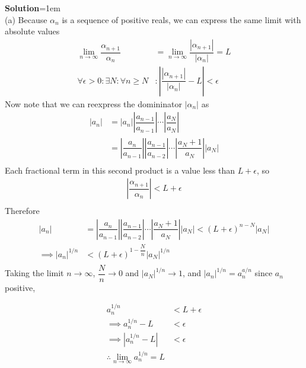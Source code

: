 \documentclass{article}
\begin{document}
\textbf{Solution}\parskip=1em\\
(a) Because $\alpha_n$ is a sequence of positive reals, we can express the same limit with absolute values
\begin{align*}
    \lim\limits_{n\to \infty} \dfrac{\alpha_{n+1}}{\alpha_n} &= \lim\limits_{n\to \infty} \dfrac{|\alpha_{n+1}|}{|\alpha_n|} = L\\
    \forall \epsilon > 0: \exists N : \forall n \geq N &: \left|\dfrac{|\alpha_{n+1}|}{|\alpha_n|} - L \right| < \epsilon
\end{align*}
Now note that we can reexpress the domininator $|\alpha_n|$ as 
\begin{align*}
    |a_n| &= |a_n|\left|\dfrac{a_{n-1}}{a_{n-1}}\right| \cdots \left|\dfrac{a_N}{a_N}\right|\\
    &= \left|\dfrac{a_{n}}{a_{n-1}}\right|\left|\dfrac{a_{n-1}}{a_{n-2}}\right| \cdots \left|\dfrac{a_N+1}{a_N}\right|\left|a_N\right|\\
\end{align*}
Each fractional term in this second product is a value less than $L+\epsilon$, so 
\begin{align*}
    \left|\dfrac{\alpha_{n+1}}{\alpha_n}\right| < L + \epsilon\\
\end{align*}
Therefore
\begin{align*}
    |a_n| &= \left|\dfrac{a_{n}}{a_{n-1}}\right|\left|\dfrac{a_{n-1}}{a_{n-2}}\right| \cdots \left|\dfrac{a_N+1}{a_N}\right|\left|a_N\right|< (L+\epsilon)^{n-N}\left|a_N\right|\\
    \implies |a_n|^{1/n} &< (L + \epsilon)^{1 - \dfrac{N}{n}}|a_N|^{1/n}\\
\end{align*}
Taking the limit $n\to \infty$, $\dfrac{N}{n} \to 0$ and $|a_N|^{1/n} \to 1$, and $|a_n|^{1/n} = a_n^{a/n}$ since $a_n$ positive,

\begin{align*}
    a_n^{1/n} &< L + \epsilon\\
    \implies a_n^{1/n} - L &< \epsilon\\
    \implies \left|a_n^{1/n} - L\right| &< \epsilon\\
    \therefore \lim\limits_{n\to \infty} a_n^{1/n} = L\\
\end{align*}
\end{document}
